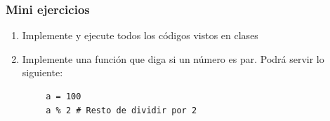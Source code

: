 \documentclass[14pt,aspectratio=169,xcolor=dvipsnames]{beamer}
\begin{document}
\begin{frame}[fragile]\frametitle{Mini ejercicios}
    \begin{enumerate}
        \item Implemente y ejecute todos los códigos vistos en clases
        \item Implemente una función que diga si un número es par. Podrá servir lo siguiente:
    \end{enumerate}
    \begin{verbatim}
        a = 100
        a % 2 # Resto de dividir por 2
    \end{verbatim}
\end{frame}
\end{document}

